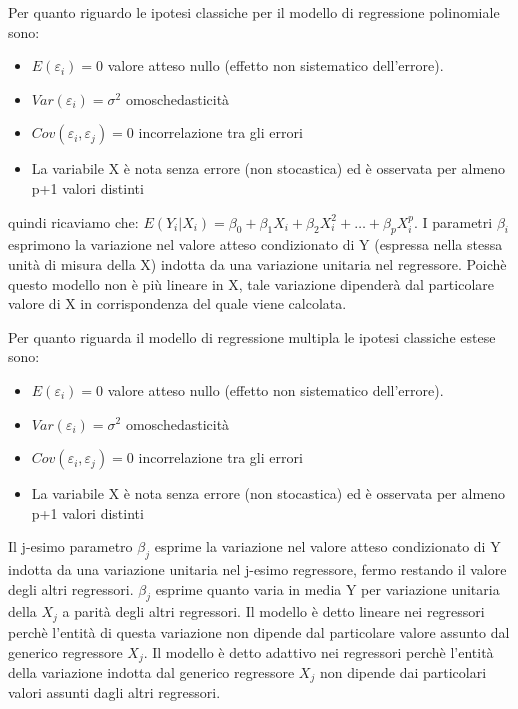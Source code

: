\documentclass[a4paper]{extarticle}
\begin{document}
Per quanto riguardo le ipotesi classiche per il modello di regressione polinomiale sono:

\begin{itemize}
\item $E( \varepsilon_i)=0$ valore atteso nullo (effetto non sistematico dell'errore).
\item $Var(\varepsilon_i) = \sigma^2$ omoschedasticità
\item  $Cov(\varepsilon_i,\varepsilon_j) = 0$ incorrelazione tra gli errori
\item La variabile X è nota senza errore (non stocastica) ed è osservata per almeno p+1 valori distinti
\end{itemize}

quindi ricaviamo che: $E(Y_i|X_i) = \beta_0 + \beta_1 X_i + \beta_2 X_i^2 + \dots + \beta_pX_i^p$. I parametri $\beta_i$ esprimono la variazione nel valore atteso condizionato di Y (espressa nella stessa unità di misura della X) indotta da una variazione unitaria nel regressore. Poichè questo modello non è più lineare in X, tale variazione dipenderà dal particolare valore di X in corrispondenza del quale viene calcolata.

Per quanto riguarda il modello di regressione multipla le ipotesi classiche estese sono:

\begin{itemize}
\item $E( \varepsilon_i)=0$ valore atteso nullo (effetto non sistematico dell'errore).
\item $Var(\varepsilon_i) = \sigma^2$ omoschedasticità
\item  $Cov(\varepsilon_i,\varepsilon_j) = 0$ incorrelazione tra gli errori
\item La variabile X è nota senza errore (non stocastica) ed è osservata per almeno p+1 valori distinti
\end{itemize}

Il j-esimo parametro $\beta_j$ esprime la variazione nel valore atteso condizionato di Y indotta da una variazione unitaria nel j-esimo regressore, fermo restando il valore degli altri regressori. $\beta_j$ esprime quanto varia in media Y per variazione unitaria della $X_j$ a parità degli altri regressori. Il modello è detto lineare nei regressori perchè l'entità di questa variazione non dipende dal particolare valore assunto dal generico regressore $X_j$. Il modello è detto adattivo nei regressori perchè l'entità della variazione indotta dal generico regressore $X_j$ non dipende dai particolari valori assunti dagli altri regressori.
\end{document}
